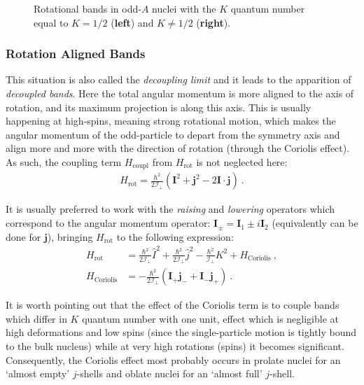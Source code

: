 \begin{figure}
    \caption{Rotational bands in odd-$A$ nuclei with the $K$ quantum number equal to $K=1/2$ (\textbf{left}) and $K\neq 1/2$ (\textbf{right}).}
    \label{rotational-bands-odd-a}
\end{figure}

\subsubsection{Rotation Aligned Bands}
\label{section-ral-signature}
This situation is also called the \emph{decoupling limit} \cite{bohr1998nuclear} and it leads to the apparition of \emph{decoupled bands}. Here the total angular momentum is more aligned to the axis of rotation, and its maximum projection is along this axis. This is usually happening at high-spins, meaning strong rotational motion, which makes the angular momentum of the odd-particle to depart from the symmetry axis and align more and more with the direction of rotation (through the Coriolis effect). As such, the coupling term $H_\text{coupl}$ from $H_\text{rot}$ is not neglected here:
\begin{align}
    H_\text{rot}=\frac{\hbar^2}{2\mathcal{I}_\perp}\left(\mathbf{I}^2+\mathbf{j}^2-2\mathbf{I}\cdot\mathbf{j}\right)\ .
\end{align}

It is usually preferred to work with the \emph{raising} and \emph{lowering} operators which correspond to the angular momentum operator: $\mathbf{I}_\pm=\mathbf{I}_1\pm i \mathbf{I}_2$ (equivalently can be done for $\mathbf{j}$), bringing $H_\text{rot}$ to the following expression:
\begin{align}
    H_\text{rot}&=\frac{\hbar^2}{2\mathcal{I}_\perp}\hat{I}^2+\frac{\hbar^2}{2\mathcal{I}_\perp}\hat{j}^2-\frac{\hbar^2}{\mathcal{I}_\perp}K^2+H_\text{Coriolis}\ ,\\
    H_\text{Coriolis}&=-\frac{\hbar^2}{2\mathcal{I}_\perp}(\mathbf{I}_+\mathbf{j}_-+\mathbf{I}_-\mathbf{j}_+)\ .
\end{align}

It is worth pointing out that the effect of the Coriolis term is to couple bands which differ in $K$ quantum number with one unit, effect which is negligible at high deformations and low spins (since the single-particle motion is tightly bound to the bulk nucleus) while at very high rotations (spins) it becomes significant. Consequently, the Coriolis effect most probably occurs in prolate nuclei for an `almost empty' $j$-shells and oblate nuclei for an `almost full' $j$-shell.

